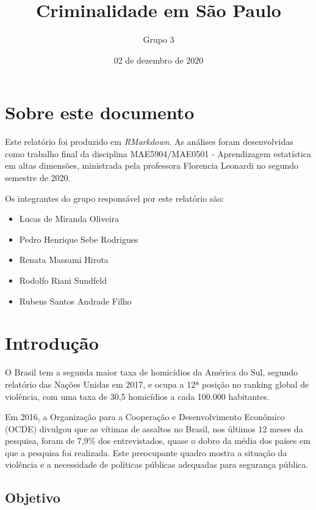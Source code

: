 \documentclass[
  12pt,
]{report}
\title{Criminalidade em São Paulo}
\author{Grupo 3}
\date{02 de dezembro de 2020}
\providecommand{\tightlist}{%
  \setlength{\itemsep}{0pt}\setlength{\parskip}{0pt}}
\begin{document}
\maketitle

{
\hypersetup{linkcolor=}
\setcounter{tocdepth}{2}
\tableofcontents
}
\listoftables
\listoffigures
\hypertarget{sobre-este-documento}{%
\chapter*{Sobre este documento}\label{sobre-este-documento}}


Este relatório foi produzido em \emph{RMarkdown}. As análises foram desenvolvidas como trabalho final da disciplina MAE5904/MAE0501 - Aprendizagem estatística em altas dimensões, ministrada pela professora Florencia Leonardi no segundo semestre de 2020.

Os integrantes do grupo responsável por este relatório são:

\begin{itemize}
\tightlist
\item
  Lucas de Miranda Oliveira
\item
  Pedro Henrique Sebe Rodrigues
\item
  Renata Massami Hirota
\item
  Rodolfo Riani Sundfeld
\item
  Rubens Santos Andrade Filho
\end{itemize}

\hypertarget{introducao}{%
\chapter{Introdução}\label{introducao}}

O Brasil tem a segunda maior taxa de homicídios da América do Sul, segundo relatório das Nações Unidas em 2017, e ocupa a 12ª posição no ranking global de violência, com uma taxa de 30,5 homicídios a cada 100.000 habitantes.

Em 2016, a Organização para a Cooperação e Desenvolvimento Econômico (OCDE) divulgou que as vítimas de assaltos no Brasil, nos últimos 12 meses da pesquisa, foram de 7,9\% dos entrevistados, quase o dobro da média dos países em que a pesquisa foi realizada. Este preocupante quadro mostra a situação da violência e a necessidade de políticas públicas adequadas para segurança pública.

\hypertarget{objetivo}{%
\section{Objetivo}\label{objetivo}}
\end{document}
